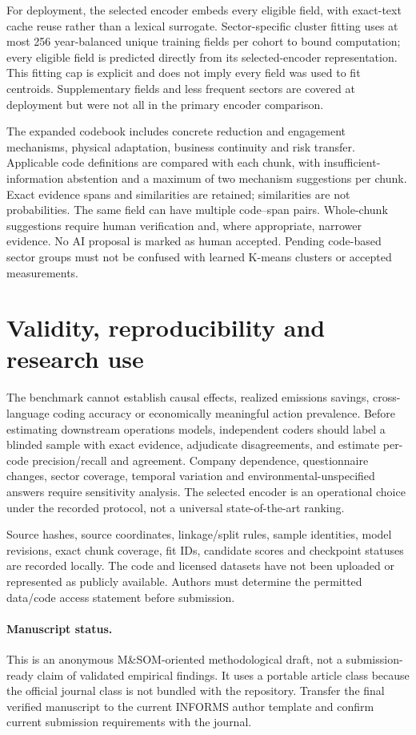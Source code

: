 \documentclass[12pt]{article}
\begin{document}
For deployment, the selected encoder embeds every eligible field, with exact-text
cache reuse rather than a lexical surrogate. Sector-specific cluster fitting
uses at most 256 year-balanced unique training fields per cohort to bound
computation; every eligible field is predicted directly from its selected-encoder
representation. This fitting cap is explicit and does not imply every field was
used to fit centroids. Supplementary fields and less frequent sectors are covered
at deployment but were not all in the primary encoder comparison.

The expanded codebook includes concrete reduction and engagement mechanisms,
physical adaptation, business continuity and risk transfer. Applicable code
definitions are compared with each chunk, with insufficient-information
abstention and a maximum of two mechanism suggestions per chunk. Exact evidence
spans and similarities are retained; similarities are not probabilities. The
same field can have multiple code--span pairs. Whole-chunk suggestions require
human verification and, where appropriate, narrower evidence.
No AI proposal is marked as human accepted. Pending code-based sector groups
must not be confused with learned K-means clusters or accepted measurements.

\section{Validity, reproducibility and research use}
The benchmark cannot establish causal effects, realized emissions savings,
cross-language coding accuracy or economically meaningful action prevalence.
Before estimating downstream operations models, independent coders should label
a blinded sample with exact evidence, adjudicate disagreements, and estimate
per-code precision/recall and agreement. Company dependence, questionnaire
changes, sector coverage, temporal variation and environmental-unspecified
answers require sensitivity analysis. The selected encoder is an operational
choice under the recorded protocol, not a universal state-of-the-art ranking.

Source hashes, source coordinates, linkage/split rules, sample identities,
model revisions, exact chunk coverage, fit IDs, candidate scores and checkpoint
statuses are recorded locally. The code and licensed datasets have not been
uploaded or represented as publicly available. Authors must determine the
permitted data/code access statement before submission.

\paragraph{Manuscript status.}
This is an anonymous M\&SOM-oriented methodological draft, not a submission-ready
claim of validated empirical findings. It uses a portable article class because
the official journal class is not bundled with the repository. Transfer
the final verified manuscript to the current INFORMS author template and confirm
current submission requirements with the journal.
\end{document}
